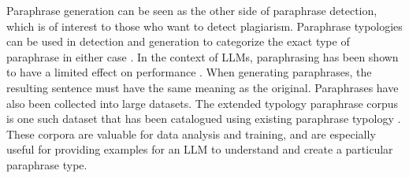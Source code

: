 Paraphrase generation can be seen as the other side of paraphrase detection, which is of
interest to those who want to detect plagiarism. Paraphrase typologies can be used in detection
and generation to categorize the exact type of paraphrase in either case \citep{wahle2023}. In
the context of LLMs, paraphrasing has been shown to have a limited effect on performance
\citep{wahle2024}. When generating paraphrases, the resulting sentence must have the same meaning
as the original. Paraphrases have also been collected into large datasets. The extended typology
paraphrase corpus is one such dataset that has been catalogued using existing paraphrase
typology \citep{kovatchev2018}. These corpora are valuable for data analysis and training, and
are especially useful for providing examples for an LLM to understand and create a particular
paraphrase type.
